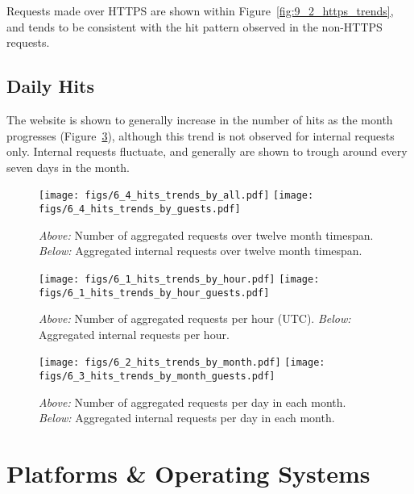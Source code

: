\documentclass[12pt,titlepage]{article}
\begin{document}
Requests made over HTTPS are shown within Figure~\ref{fig:9_2_https_trends}, and tends to be consistent with the hit pattern observed in the non-HTTPS requests.

\subsection{Daily Hits}

The website is shown to generally increase in the number of hits as the month progresses (Figure~\ref{fig:6_2_hits_trends_by_month}), although this trend is not observed for internal requests only. Internal requests fluctuate, and generally are shown to trough around every seven days in the month.

\begin{figure}[thbp]
  \centering
  \texttt{[image: figs/6\_4\_hits\_trends\_by\_all.pdf]}
    \texttt{[image: figs/6\_4\_hits\_trends\_by\_guests.pdf]}
  \caption[Trends of hits over 12 months]{\textit{Above:} Number of aggregated requests over twelve month timespan. \textit{Below:} Aggregated internal requests over twelve month timespan.}
  \label{fig:6_4_hits_trends_by_all}
\end{figure}

\begin{figure}[thbp]
  \centering
  \texttt{[image: figs/6\_1\_hits\_trends\_by\_hour.pdf]}
  \texttt{[image: figs/6\_1\_hits\_trends\_by\_hour\_guests.pdf]}
  \caption[Trends of hits per hour]{\textit{Above:} Number of aggregated requests per hour (UTC). \textit{Below:} Aggregated internal requests per hour.}
  \label{fig:6_1_hits_trends_by_hour}
\end{figure}

\begin{figure}[thbp]
  \centering
  \texttt{[image: figs/6\_2\_hits\_trends\_by\_month.pdf]}
  \texttt{[image: figs/6\_3\_hits\_trends\_by\_month\_guests.pdf]}
  \caption[Trends of hits each month]{\textit{Above:} Number of aggregated requests per day in each month. \textit{Below:} Aggregated internal requests per day in each month.}
  \label{fig:6_2_hits_trends_by_month}
\end{figure}

\newpage
\clearpage
\section{Platforms \& Operating Systems}
\end{document}
